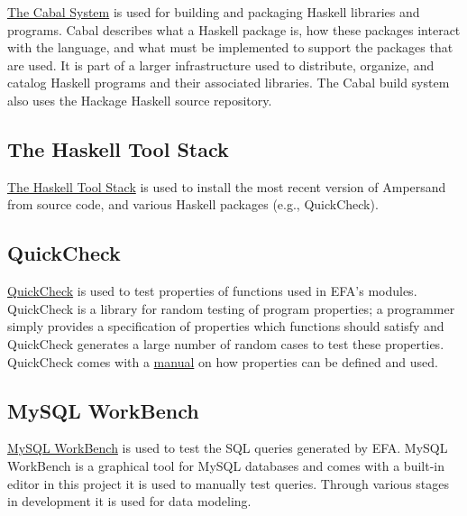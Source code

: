 \documentclass[journal,12pt,onecolumn,draftclsnofoot]{report}
\let\Oldsubsection\subsection
\renewcommand{\subsection}{\FloatBarrier\Oldsubsection}
\begin{document}
 

\href{https://www.haskell.org/cabal/}{The Cabal System} is used for building 
and packaging Haskell libraries and programs. 
Cabal describes what a Haskell package is, how these packages interact with the 
language, and what must be implemented to support the packages that are used. 
It is part of a larger infrastructure used to distribute, organize, and catalog 
Haskell programs and their associated libraries. The Cabal build system
also uses the Hackage \cite{hackage} Haskell source repository.

\subsection*{The Haskell Tool Stack}

\href{https://www.haskell.org/cabal/}{The Haskell Tool Stack} is used to 
install the most recent version of Ampersand from source code, and various 
Haskell packages (e.g., QuickCheck).

\subsection*{QuickCheck}

\href{https://hackage.haskell.org/package/QuickCheck}{QuickCheck} is used to 
test properties of functions used in EFA's modules. QuickCheck is a library for 
random testing of program properties; a programmer simply provides a 
specification of properties which functions should satisfy
and QuickCheck generates a large number of random cases to test these properties.
QuickCheck comes with a
\href{http://www.cse.chalmers.se/~rjmh/QuickCheck/manual.html}{manual} on how 
properties can be defined and used. 

\subsection*{MySQL WorkBench}

\href{https://dev.mysql.com/doc/workbench/en/}{MySQL WorkBench} is used to test 
the SQL queries generated by EFA. MySQL WorkBench is a graphical tool for MySQL 
databases and comes with a built-in editor in this project it is used to 
manually test queries. Through various stages in development it is used for 
data modeling.
\end{document}
